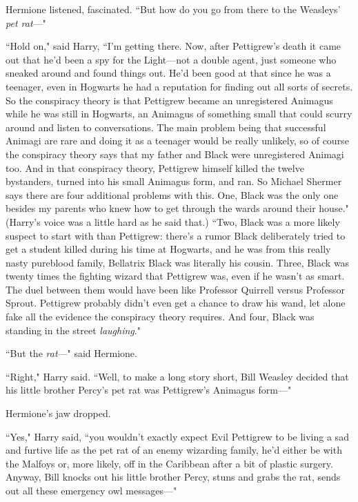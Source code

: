 Hermione listened, fascinated. ``But how do you go from there to the Weasleys' \emph{pet rat}—"

``Hold on," said Harry, ``I'm getting there. Now, after Pettigrew's death it came out that he'd been a spy for the Light—not a double agent, just someone who sneaked around and found things out. He'd been good at that since he was a teenager, even in Hogwarts he had a reputation for finding out all sorts of secrets. So the conspiracy theory is that Pettigrew became an unregistered Animagus while he was still in Hogwarts, an Animagus of something small that could scurry around and listen to conversations. The main problem being that successful Animagi are rare and doing it as a teenager would be really unlikely, so of course the conspiracy theory says that my father and Black were unregistered Animagi too. And in that conspiracy theory, Pettigrew himself killed the twelve bystanders, turned into his small Animagus form, and ran. So Michael Shermer says there are four additional problems with this. One, Black was the only one besides my parents who knew how to get through the wards around their house." (Harry's voice was a little hard as he said that.) ``Two, Black was a more likely suspect to start with than Pettigrew: there's a rumor Black deliberately tried to get a student killed during his time at Hogwarts, and he was from this really nasty pureblood family, Bellatrix Black was literally his cousin. Three, Black was twenty times the fighting wizard that Pettigrew was, even if he wasn't as smart. The duel between them would have been like Professor Quirrell versus Professor Sprout. Pettigrew probably didn't even get a chance to draw his wand, let alone fake all the evidence the conspiracy theory requires. And four, Black was standing in the street \emph{laughing}."

``But the \emph{rat}—" said Hermione.

``Right," Harry said. ``Well, to make a long story short, Bill Weasley decided that his little brother Percy's pet rat was Pettigrew's Animagus form—"

Hermione's jaw dropped.

``Yes," Harry said, ``you wouldn't exactly expect Evil Pettigrew to be living a sad and furtive life as the pet rat of an enemy wizarding family, he'd either be with the Malfoys or, more likely, off in the Caribbean after a bit of plastic surgery. Anyway, Bill knocks out his little brother Percy, stuns and grabs the rat, sends out all these emergency owl messages—"

